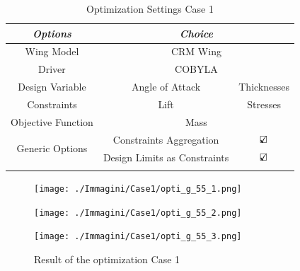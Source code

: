 \begin{table}[H]
	\centering
	\begin{tabular}{ccc}
		\hline
		\multicolumn{1}{|c|}{\textit{Options}}                          & \multicolumn{2}{c|}{\textit{Choice}}                                               \\ \hline
		\multicolumn{1}{|c|}{Wing Model}                       & \multicolumn{2}{c|}{CRM Wing}                                                     \\ \hline
		\multicolumn{1}{|c|}{Driver}                           & \multicolumn{2}{c|}{COBYLA}                                                     \\ \hline
		\multicolumn{1}{|c|}{Design Variable}                  & \multicolumn{1}{c|}{Angle of Attack}&\multicolumn{1}{c|}{Thicknesses}                                                     \\ \hline
				\multicolumn{1}{|c|}{Constraints}                  & \multicolumn{1}{c|}{Lift }&\multicolumn{1}{c|}{Stresses}                                                     \\ \hline
		\multicolumn{1}{|c|}{Objective Function}               & \multicolumn{2}{c|}{Mass}                                                     \\ \hline
		\multicolumn{1}{|c|}{\multirow{2}{*}{Generic Options}} & \multicolumn{1}{c|}{Constraints Aggregation}      & \multicolumn{1}{c|}{$\text{\rlap{$\checkmark$}}\square$} \\ \cline{2-3} 
		\multicolumn{1}{|c|}{}                                 & \multicolumn{1}{c|}{Design Limits as Constraints} & \multicolumn{1}{c|}{$\text{\rlap{$\checkmark$}}\square$} \\ \hline
		&                                                   &                      
	\end{tabular}
\caption{Optimization Settings Case 1}
\label{tab:6_1}
\end{table}
\begin{figure}[H]
	\centering
	\texttt{[image: ./Immagini/Case1/opti\_g\_55\_1.png]}
\end{figure}
\begin{figure}[H]
	\centering
	\texttt{[image: ./Immagini/Case1/opti\_g\_55\_2.png]}
\end{figure}
\begin{figure}[H]
	\centering
	\texttt{[image: ./Immagini/Case1/opti\_g\_55\_3.png]}
	\caption{Result of the optimization Case 1}
	\label{fig:6_2}
\end{figure}
